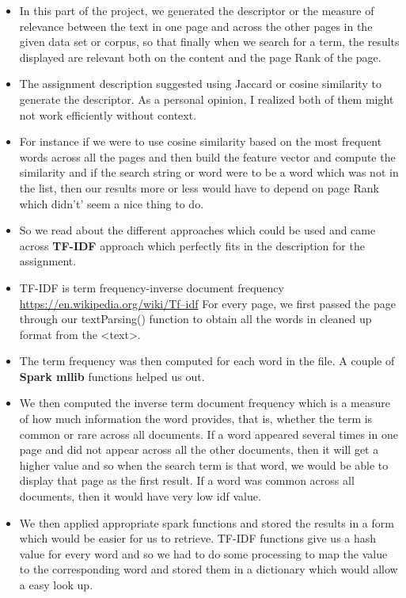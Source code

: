 \documentclass[11pt]{article}
\begin{document}
\begin{itemize}
	
	\item[] In this part of the project, we generated the descriptor or the measure of relevance between the text in one page and across the other pages in the given data set or corpus, so that finally when we search for a term, the results displayed are relevant both on the content and the page Rank of the page.
	
	\item The assignment description suggested using Jaccard or cosine similarity to generate the descriptor. As a personal opinion, I realized both of them might not work efficiently without context. 
	
	\item For instance if we were to use cosine similarity based on the most frequent words across all the pages and then build the feature vector and compute the similarity and if the search string or word were to be a word which was not in the list, then our results more or less would have to depend on page Rank which didn't' seem a nice thing to do.
	
	\item So we read about the different approaches which could be used and came across \textbf{TF-IDF} approach which perfectly fits in the description for the assignment.
	
	\item TF-IDF is term frequency-inverse document frequency \url{https://en.wikipedia.org/wiki/Tf–idf} For every page, we first passed the page through our textParsing() function to obtain all the words in cleaned up format from the <text>.
	
	\item The term frequency was then computed for each word in the file. A  couple of \textbf{Spark mllib} functions helped us out.
	
	\item We then computed the inverse term document frequency which is a measure of how much information the word provides, that is, whether the term is common or rare across all documents. If a word appeared several times in one page and did not appear across all the other documents, then it will get a higher value and so when the search term is that word, we would be able to display that page as the first result. If a word was common across all documents, then it would have very low idf value.
	
	\item We then applied appropriate spark functions and stored the results in a form which would be easier for us to retrieve. TF-IDF functions give us a hash value for every word and so we had to do some processing to map the value to the corresponding word and stored them in  a dictionary which would allow a easy look up.
	

\end{itemize}
\end{document}
